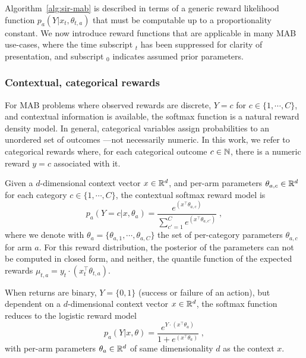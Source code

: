 
Algorithm~\ref{alg:sir-mab} is described in terms of a generic reward likelihood function $p_a(Y|x_t,\theta_{t,a})$
that must be computable up to a proportionality constant.
We now introduce reward functions that are applicable in many MAB use-cases,
where the time subscript $_t$ has been suppressed for clarity of presentation,
and subscript $_0$ indicates assumed prior parameters.

\subsubsection{Contextual, categorical rewards}
\label{sssec:categorical_softmax_rewards}

For MAB problems where observed rewards are discrete,
\ie $Y=c$ for $c\in\{1,\cdots,C\}$,
and contextual information is available,
the softmax function is a natural reward density model.
In general, categorical variables assign probabilities to an unordered set of outcomes ---not necessarily numeric.
In this work,
we refer to categorical rewards where,
for each categorical outcome $c\in{\mathbb N}$,
there is a numeric reward $y=c$ associated with it.

Given a $d$-dimensional context vector $x\in{\mathbb R}^{d}$,
and per-arm parameters $\theta_{a,c} \in {\mathbb R}^{d}$ for each category $c\in\{1,\cdots,C\}$,
the contextual softmax reward model is
\begin{equation}
p_a(Y=c|x,\theta_a)=\frac{e^{(x^\top\theta_{a,c})}}{\sum_{c'=1}^C e^{(x^\top\theta_{a,c'})} } \; ,
\label{eq:softmax_rewards}
\end{equation}
where we denote with $\theta_a=\{\theta_{a,1}, \cdots, \theta_{a,C}\}$ the set of per-category parameters $\theta_{a,c}$ for arm $a$.
For this reward distribution,
the posterior of the parameters can not be computed in closed form,
and neither, the quantile function of the expected rewards $\mu_{t,a}=y_t\cdot(x_t^\top\theta_{t,a})$.

When returns are binary, \ie $Y=\{0,1\}$ (success or failure of an action),
but dependent on a $d$-dimensional context vector $x\in{\mathbb R}^{d}$,
the softmax function reduces to the logistic reward model
\begin{equation}
p_a(Y|x,\theta)=\frac{e^{Y\cdot(x^\top\theta_a) }}{1+e^{(x^\top\theta_a)}} \; ,
\label{eq:logistic_rewards}
\end{equation}
with per-arm parameters $\theta_a \in {\mathbb R}^{d}$ of same dimensionality $d$ as the context $x$.

